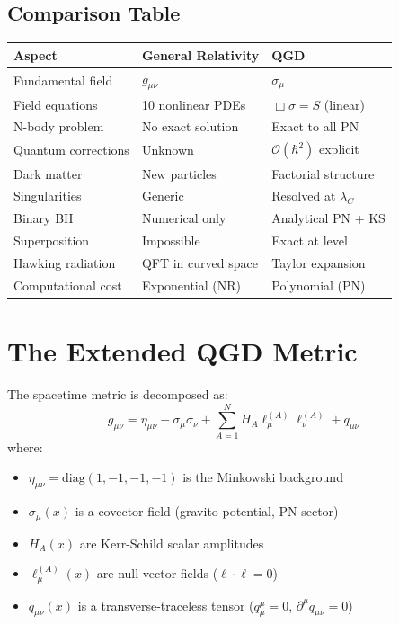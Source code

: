 \documentclass[11pt,a4paper]{article}
\theoremstyle{definition}
\theoremstyle{remark}
\begin{document}
	\subsection{Comparison Table}
	
	\begin{center}
		\begin{tabular}{lll}
			\toprule
			\textbf{Aspect} & \textbf{General Relativity} & \textbf{QGD}\\
			\midrule
			Fundamental field & $g_{\mu\nu}$ & $\sigma_\mu$\\
			Field equations & 10 nonlinear PDEs & $\Box\sigma = S$ (linear)\\
			N-body problem & No exact solution & Exact to all PN\\
			Quantum corrections & Unknown & $\mathcal{O}(\hbar^2)$ explicit\\
			Dark matter & New particles & Factorial structure\\
			Singularities & Generic & Resolved at $\lambda_C$\\
			Binary BH & Numerical only & Analytical PN + KS\\
			Superposition & Impossible & Exact at level\\
			Hawking radiation & QFT in curved space & Taylor expansion\\
			Computational cost & Exponential (NR) & Polynomial (PN)\\
			\bottomrule
		\end{tabular}
	\end{center}
	

	\section{The Extended QGD Metric}
		
			The spacetime metric is decomposed as:
			\begin{equation}\label{eq:master_metric}
				\boxed{g_{\mu\nu} = \eta_{\mu\nu} - \sigma_\mu\sigma_\nu + \sum_{A=1}^N H_A\ell_\mu^{(A)}\ell_\nu^{(A)} + q_{\mu\nu}}
			\end{equation}
			where:
				\begin{itemize}
					\item $\eta_{\mu\nu} = \mathrm{diag}(1,-1,-1,-1)$ is the Minkowski background
					\item $\sigma_\mu(x)$ is a covector field (gravito-potential, PN sector)
					\item $H_A(x)$ are Kerr-Schild scalar amplitudes
					\item $\ell_\mu^{(A)}(x)$ are null vector fields ($\ell \cdot \ell = 0$)
					\item $q_{\mu\nu}(x)$ is a transverse-traceless tensor ($q^\mu_\mu = 0$, $\partial^\mu q_{\mu\nu} = 0$)
				\end{itemize}
		
\end{document}
